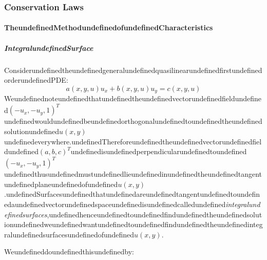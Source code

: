 \subsubsection{Conservation Laws}

\paragraph{TheundefinedMethodundefinedofundefinedCharacteristics}

\subparagraph{IntegralundefinedSurface}

ConsiderundefinedtheundefinedgeneralundefinedquasilinearundefinedfirstundefinedorderundefinedPDE:
\begin{equation}
a(x,y,u)u_x + b(x,y,u)u_y = c(x,y,u)
\end{equation}
Weundefinednoteundefinedthatundefinedtheundefinedvectorundefinedfieldundefined$( -u_x, -u_y, 1)^T$undefinedwouldundefinedbeundefinedorthogonalundefinedtoundefinedtheundefinedsolutionundefined$u(x,y)$undefinedeverywhere.undefinedThereforeundefinedtheundefinedvectorundefinedfieldundefined$(a, b, c)^T$undefinedisundefinedperpendicularundefinedtoundefined$( -u_x, -u_y, 1)^T$undefinedthusundefinedmustundefinedlieundefinedinundefinedtheundefinedtangentundefinedplaneundefinedofundefined$u(x,y)$.undefinedSurfacesundefinedthatundefinedareundefinedtangentundefinedtoundefinedaundefinedvectorundefinedspaceundefinedisundefinedcalledundefined\textit{integralundefinedsurfaces},undefinedhenceundefinedtoundefinedfindundefinedtheundefinedsolutionundefinedweundefinedwantundefinedtoundefinedfindundefinedtheundefinedintegralundefinedsurfacesundefinedofundefined$u(x,y)$.

Weundefineddoundefinedthisundefinedby:

